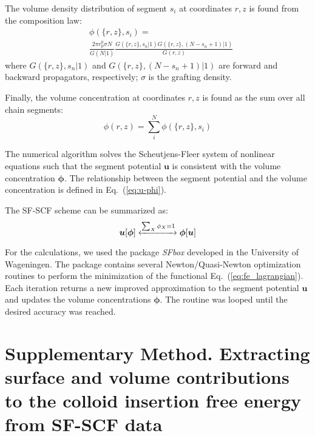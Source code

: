 \documentclass[10pt, a4paper]{article}
\begin{document}
\begin{multicols}{2}
The volume density distribution of segment $s_i$ at coordinates $r, z$ is found from the composition law:
\begin{equation}
    \label{eq:propagation}
    \begin{aligned}
        &\phi(\{r, z\}, s_i) = \\
        &\frac{2 \pi r_{\text{p}}^{0} \sigma N}{G(N|1)}
        \frac{G(\{r, z\}, s_n | 1) G(\{r, z\}, (N - s_n + 1) | 1)}{G(r, z)}
    \end{aligned}
\end{equation}
where $G(\{r, z\}, s_n | 1)$ and $G(\{r, z\}, (N - s_n + 1) | 1)$ are forward and backward propagators, respectively; $\sigma$ is the grafting density.

Finally, the volume concentration at coordinates $r, z$ is found as the sum over all chain segments:
\begin{equation}
    \phi(r, z) = \sum_{i}^{N} \phi(\{r, z\}, s_i)
\end{equation}

The numerical algorithm solves the Scheutjens-Fleer system of nonlinear equations such that the segment potential $\bm{u}$ is consistent with the volume concentration $\boldsymbol{\phi}$.
The relationship between the segment potential and the volume concentration is defined in Eq.~(\ref{eq:u-phi}).

The SF-SCF scheme can be summarized as:
\begin{equation}
    \boldsymbol{u}[\boldsymbol{\phi}] \xleftrightarrow[]{\sum_{X} \phi_X = 1} \boldsymbol{\phi}[\boldsymbol{u}]
\end{equation}

For the calculations, we used the package \emph{SFbox} developed in the University of Wageningen.
The package contains several Newton/Quasi-Newton optimization routines to perform the minimization of the functional Eq.~(\ref{eq:fe_lagrangian}).
Each iteration returns a new improved approximation to the segment potential $\bm{u}$ and updates the volume concentrations $\bm{\phi}$.
The routine was looped until the desired accuracy was reached.

\end{multicols}


\section{Supplementary Method. Extracting surface and volume contributions to the colloid insertion free energy from SF-SCF data}
\end{document}
